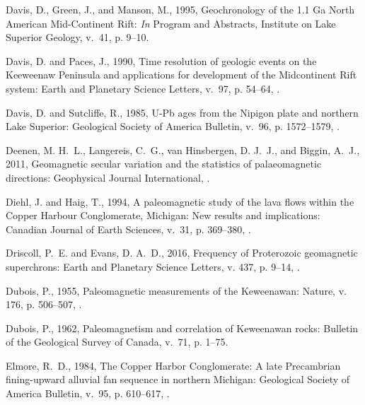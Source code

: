 \documentclass[11pt,letterpaper]{article}
\begin{document}
\begin{thebibliography}{153}
Davis, D., Green, J., and Manson, M., 1995, Geochronology of the 1.1 {Ga North
  American Mid-Continent Rift}: \emph{In} Program and Abstracts, Institute on
  Lake Superior Geology, v.~41, p. 9--10.

Davis, D. and Paces, J., 1990, Time resolution of geologic events on the
  {K}eeweenaw {P}eninsula and applications for development of the
  {M}idcontinent {R}ift system: Earth and Planetary Science Letters, v.~97, p.
  54--64, .

Davis, D. and Sutcliffe, R., 1985, {U}-{P}b ages from the {N}ipigon plate and
  northern {L}ake {S}uperior: Geological Society of America Bulletin, v.~96, p.
  1572--1579, .

Deenen, M. H.~L., Langereis, C.~G., van Hinsbergen, D. J.~J., and Biggin,
  A.~J., 2011, Geomagnetic secular variation and the statistics of
  palaeomagnetic directions: Geophysical Journal International,
  .

Diehl, J. and Haig, T., 1994, A paleomagnetic study of the lava flows within
  the {C}opper {H}arbour {C}onglomerate, {M}ichigan: {N}ew results and
  implications: Canadian Journal of Earth Sciences, v.~31, p. 369--380,
  .

Driscoll, P.~E. and Evans, D. A.~D., 2016, Frequency of {P}roterozoic
  geomagnetic superchrons: Earth and Planetary Science Letters, v. 437, p.
  9--14, .

Dubois, P., 1955, Paleomagnetic measurements of the {K}eweenawan: Nature, v.
  176, p. 506--507, .

Dubois, P., 1962, Paleomagnetism and correlation of {K}eweenawan rocks:
  Bulletin of the Geological Survey of Canada, v.~71, p. 1--75.

Elmore, R.~D., 1984, {The Copper Harbor Conglomerate: A late Precambrian
  fining-upward alluvial fan sequence in northern Michigan}: Geological Society
  of America Bulletin, v.~95, p. 610--617,
  .


\end{thebibliography}
\end{document}
